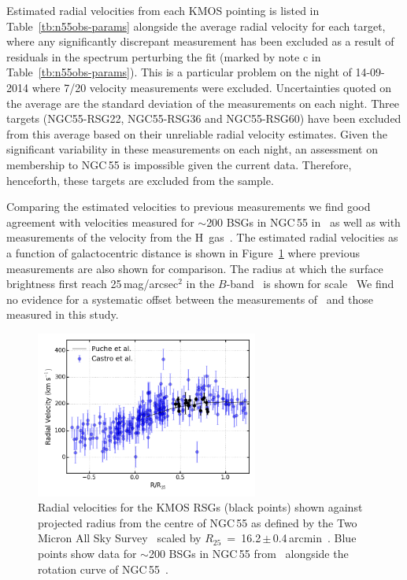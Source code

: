 Estimated radial velocities from each KMOS pointing is listed in Table~\ref{tb:n55obs-params} alongside the average radial velocity for each target, where any significantly discrepant measurement has been excluded as a result of residuals in the spectrum perturbing the fit (marked by note c in Table~\ref{tb:n55obs-params}).
This is a particular problem on the night of 14-09-2014 where 7/20 velocity measurements were excluded.
Uncertainties quoted on the average are the standard deviation of the measurements on each night.
Three targets (NGC55-RSG22, NGC55-RSG36 and NGC55-RSG60) have been excluded from this average based on their unreliable radial velocity estimates.
Given the significant variability in these measurements on each night, an assessment on membership to NGC\,55 is impossible given the current data.
Therefore, henceforth, these targets are excluded from the sample.

Comparing the estimated velocities to previous measurements we find good agreement with velocities measured for $\sim$200 BSGs in NGC\,55 in~\citep{2008A&A...485...41C} as well as with measurements of the velocity from the H\,\1 gas~\citep{1991AJ....101..447P}.
The estimated radial velocities as a function of galactocentric distance is shown in Figure~\ref{fig:RvsRV} where previous measurements are also shown for comparison.
The radius at which the surface brightness first reach 25\,mag/arcsec$^2$ in the $B$-band~\citep[R$_{25}$ e.g.][]{2015eaci.book.....S} is shown for scale~\citep[$R_{25}$~=~16.2\,$\pm$\,0.4\,arcmin][]{1991rc3..book.....D}
We find no evidence for a systematic offset between the measurements of~\cite{2008A&A...485...41C} and those measured in this study.

\begin{figure}
 \centering
 \includegraphics[width=0.65\textwidth]{ngc55/NGC55-RvsRV}
 \caption[Radial velocities for KMOS targets shown against projected radius]{
 Radial velocities for the KMOS RSGs (black points) shown against projected radius from the centre of NGC\,55 as defined by the Two Micron All Sky Survey~\citep[2MASS;][]{2006AJ....131.1163S} scaled by $R_{25}$~=~16.2\,$\pm$\,0.4\,arcmin~\citep{1991rc3..book.....D}.
Blue points show data for $\sim$200 BSGs in NGC\,55 from~\citep[][; shown with 50\% transparency to highlight densely populated areas]{2008A&A...485...41C} alongside the rotation curve of NGC\,55~\citep[black solid line;][]{1991AJ....101..447P}.}
 \label{fig:RvsRV}
\end{figure}

